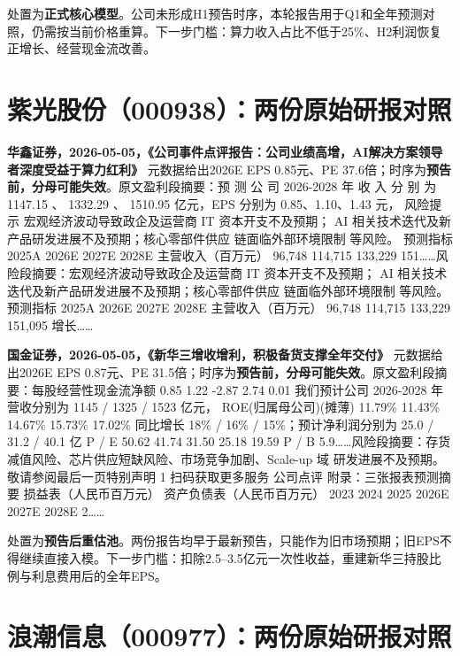 \begin{keyinsight}[AStock处理]
处置为\textbf{正式核心模型}。公司未形成H1预告时序，本轮报告用于Q1和全年预测对照，仍需按当前价格重算。下一步门槛：算力收入占比不低于25\%、H2利润恢复正增长、经营现金流改善。
\end{keyinsight}

\section{紫光股份（000938）：两份原始研报对照}

\textbf{华鑫证券，2026-05-05，《公司事件点评报告：公司业绩高增，AI解决方案领导者深度受益于算力红利》}
元数据给出2026E EPS 0.85元、PE 37.6倍；时序为\textbf{预告前，分母可能失效}。原文盈利段摘要：预 测 公 司 2026-2028 年 收 入 分 别 为 1147.15 、 1332.29 、 1510.95 亿元，EPS 分别为 0.85、1.10、1.43 元， 风险提示 宏观经济波动导致政企及运营商 IT 资本开支不及预期； AI 相关技术迭代及新产品研发进展不及预期；核心零部件供应 链面临外部环境限制 等风险。 预测指标 2025A 2026E 2027E 2028E 主营收入（百万元） 96,748 114,715 133,229 151……风险段摘要：宏观经济波动导致政企及运营商 IT 资本开支不及预期； AI 相关技术迭代及新产品研发进展不及预期；核心零部件供应 链面临外部环境限制 等风险。 预测指标 2025A 2026E 2027E 2028E 主营收入（百万元） 96,748 114,715 133,229 151,095 增长……

\textbf{国金证券，2026-05-05，《新华三增收增利，积极备货支撑全年交付》}
元数据给出2026E EPS 0.87元、PE 31.5倍；时序为\textbf{预告前，分母可能失效}。原文盈利段摘要：每股经营性现金流净额 0.85 1.22 -2.87 2.74 0.01 我们预计公司 2026-2028 年营收分别为 1145 / 1325 / 1523 亿元， ROE(归属母公司)(摊薄) 11.79\% 11.43\% 14.67\% 15.73\% 17.02\% 同比增长 18\% / 16\% / 15\%；预计净利润分别为 25.0 / 31.2 / 40.1 亿 P / E 50.62 41.74 31.50 25.18 19.59 P / B 5.9……风险段摘要：存货减值风险、芯片供应短缺风险、市场竞争加剧、Scale-up 域 研发进展不及预期。 敬请参阅最后一页特别声明 1 扫码获取更多服务 公司点评 附录：三张报表预测摘要 损益表（人民币百万元） 资产负债表（人民币百万元） 2023 2024 2025 2026E 2027E 2028E 2……

\begin{keyinsight}[AStock处理]
处置为\textbf{预告后重估池}。两份报告均早于最新预告，只能作为旧市场预期；旧EPS不得继续直接入模。下一步门槛：扣除2.5--3.5亿元一次性收益，重建新华三持股比例与利息费用后的全年EPS。
\end{keyinsight}

\section{浪潮信息（000977）：两份原始研报对照}

